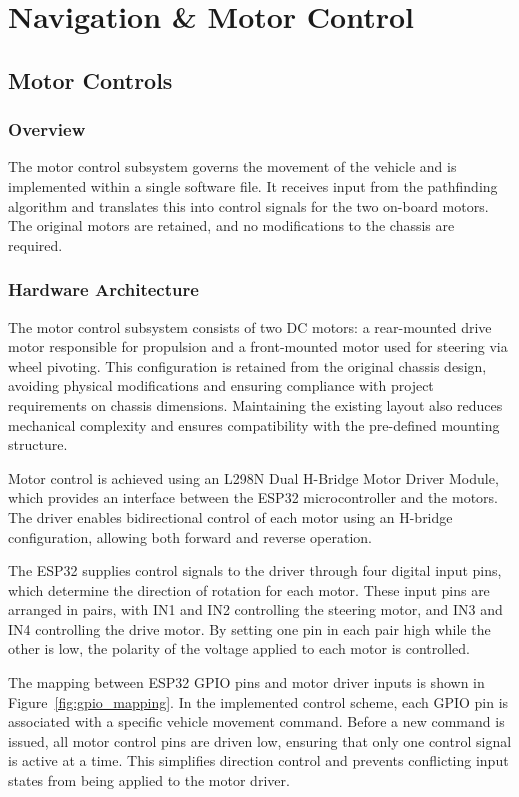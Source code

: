 \chapter{Navigation \& Motor Control}

\section{Motor Controls}

\subsection{Overview}

The motor control subsystem governs the movement of the vehicle and is implemented within a single software file. It receives input from the pathfinding algorithm and translates this into control signals for the two on-board motors. The original motors are retained, and no modifications to the chassis are required.

\subsection{Hardware Architecture}

The motor control subsystem consists of two DC motors: a rear-mounted drive motor responsible for propulsion and a front-mounted motor used for steering via wheel pivoting. This configuration is retained from the original chassis design, avoiding physical modifications and ensuring compliance with project requirements on chassis dimensions. Maintaining the existing layout also reduces mechanical complexity and ensures compatibility with the pre-defined mounting structure.

Motor control is achieved using an L298N Dual H-Bridge Motor Driver Module, which provides an interface between the ESP32 microcontroller and the motors. The driver enables bidirectional control of each motor using an H-bridge configuration, allowing both forward and reverse operation.

The ESP32 supplies control signals to the driver through four digital input pins, which determine the direction of rotation for each motor. These input pins are arranged in pairs, with IN1 and IN2 controlling the steering motor, and IN3 and IN4 controlling the drive motor. By setting one pin in each pair high while the other is low, the polarity of the voltage applied to each motor is controlled.

The mapping between ESP32 GPIO pins and motor driver inputs is shown in Figure~\ref{fig:gpio_mapping}. In the implemented control scheme, each GPIO pin is associated with a specific vehicle movement command. Before a new command is issued, all motor control pins are driven low, ensuring that only one control signal is active at a time. This simplifies direction control and prevents conflicting input states from being applied to the motor driver.

